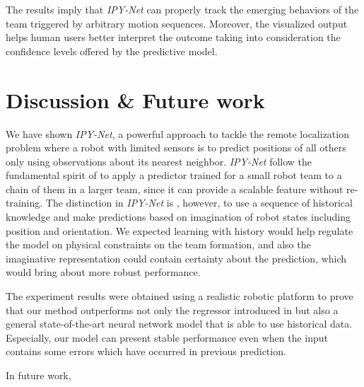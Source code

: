 \documentclass[letterpaper, 10 pt, conference]{ieeeconf}  %
\begin{document}
	The results imply that \emph{IPY-Net} can properly track the emerging behaviors of the team 
	triggered by arbitrary motion sequences. Moreover, the visualized output helps
	human users better interpret the outcome taking into consideration the confidence levels 
	offered by the predictive model. 
	

	\section{Discussion \& Future work}
	\label{sec:discussion_and_future_work}
	
	We have shown \emph{IPY-Net}, a powerful approach to tackle the remote localization problem 
	where a robot with limited sensors is to predict positions of all others only using 
	observations about its nearest neighbor. 
	\emph{IPY-Net} follow the fundamental spirit of \cite{Choi17} to apply a predictor 
	trained for a small robot team to a chain of them in a larger team, since it 
	can provide a scalable feature without re-training.   
	The distinction in \emph{IPY-Net} is , however, to use a sequence of historical knowledge and 
	make predictions based on imagination of robot states including position and orientation.
	We expected learning with history would help regulate the model on physical constraints on 
	the team formation, and also the imaginative representation could contain 
	certainty about the prediction, which would bring about more robust performance. 
	
	The experiment results were obtained using a realistic robotic platform to prove 
	that our method outperforms not only the regressor
	introduced in \cite{Choi17} but also a general state-of-the-art neural network 
	model that is able to use historical data. Especially, our model can present 
	stable performance even when the input contains some errors which have occurred in 
	previous prediction. 
	  
	
	In future work, 
	
	
{\small
	
	
}
\end{document}
